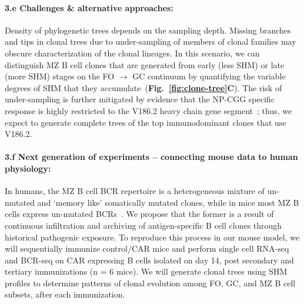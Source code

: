 \documentclass[11pt]{article}
\newcommand{\para}[1]{\vspace*{-4.5mm}\paragraph{#1}}
\begin{document}


\para{{3.e Challenges \& alternative approaches:}}
Density of phylogenetic trees depends on the sampling depth.
Missing branches and tips in  clonal trees due to under-sampling of  members of clonal families may obscure characterization of the clonal lineages.
In this scenario, we can distinguish MZ B cell clones that are generated from early (less SHM) or late (more SHM) stages on the FO $\rightarrow$ GC continuum by quantifying the variable degrees of SHM that they accumulate~(\textbf{Fig.~\ref{fig:clone-tree}C}).
The risk of under-sampling is further mitigated by evidence that the NP-CGG specific response is highly restricted to the V186.2 heavy chain gene segment~\cite{Bothwell_1981, Bothwell_1982}; thus, we expect to generate complete trees of the top immunodominant clones that use V186.2. %



\para{{3.f Next generation of experiments --  connecting mouse data to human physiology:}}
In humans, the MZ B cell BCR repertoire is a heterogeneous mixture of un-mutated and `memory like' somatically mutated clones, while in mice most MZ B cells express un-mutated BCRs~\cite{Kibler_2021, Weller_2004, Cerutti_2013, Pillai_2005}.
We propose that the former is a result of continuous infiltration and archiving of antigen-specific B cell clones through historical pathogenic exposure.
To reproduce this process in our mouse model, we will sequentially immunize control/CAR mice and perform  single cell RNA-seq and BCR-seq on CAR expressing B cells isolated on day 14, post secondary and tertiary immunizations (n = 6 mice). %
We will generate clonal trees using SHM profiles to determine patterns of clonal evolution among FO, GC, and MZ B cell subsets, after each immunization.
\end{document}
